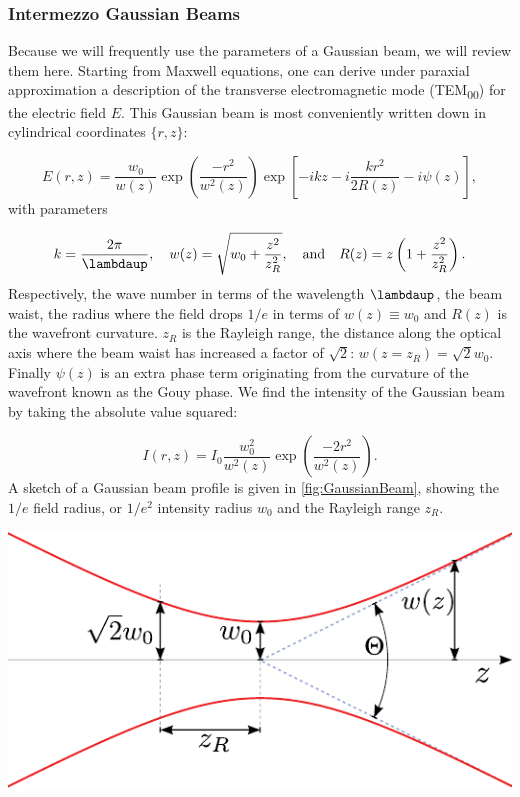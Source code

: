 \mbox{}\par
\begin{mdframed}
    \subsubsection*{Intermezzo Gaussian Beams}\label{sec:GaussianBeams}
    
    Because we will frequently use the parameters of a Gaussian beam, we will review them here. 
    Starting from Maxwell equations, one can derive under paraxial approximation a description of the transverse electromagnetic mode (TEM\textsubscript{00}) \cite{Leeuwen2017} for the electric field $E$.
    This Gaussian beam is most conveniently written down in cylindrical coordinates $\{r,z\}$:
    
    \begin{equation}\label{eq:GaussianBeam}
    	E(r,z) = \frac{w_0}{w(z)} \exp{\left(\frac{-r^2}{w^2(z)}\right)} \exp{\left[-ikz-i\frac{kr^2}{2R(z)} - i\psi(z)\right]},
    \end{equation}
    with parameters
    
    \begin{equation}\label{eq:GaussianBeamParameters}
    	k = \frac{2\pi}{\lambdaup}, \quad 
    	w(z) = \sqrt{w_0 + \frac{z^2}{z_R^2}}, \quad \text{and} \quad
    	R(z) = z \left(1 + \frac{z^2}{z_R^2}\right).
    \end{equation}
    Respectively, the wave number in terms of the wavelength $\lambdaup$, the beam waist, the radius where the field drops $1/e$ in terms of $w(z)\equiv w_0$ and $R(z)$ is the wavefront curvature. $z_R$ is the Rayleigh range, the distance along the optical axis where the beam waist has increased a factor of $\sqrt{2}$: $w(z=z_R) = \sqrt{2}w_0$.
    Finally $\psi(z)$ is an extra phase term originating from the curvature of the wavefront known as the Gouy phase.
    We find the intensity of the Gaussian beam by taking the absolute value squared:
    
    \begin{equation}\label{eq:GaussianBeamIntensity}
    	I(r,z) = I_0 \frac{w_0^2}{w^2(z)} \exp{\left(\frac{-2r^2}{w^2(z)}\right)}.
    \end{equation}
    A sketch of a Gaussian beam profile is given in \cref{fig:GaussianBeam}, showing the $1/e$ field radius, or $1/e^2$ intensity radius $w_0$ and the Rayleigh range $z_R$. 
    
    \vspace*{3mm}
    \centering
        \includegraphics[width=0.52\linewidth]{figures/GaussianBeam.pdf}
        \captionsetup{margin=0mm}%
        \label{fig:GaussianBeam}
\end{mdframed}
